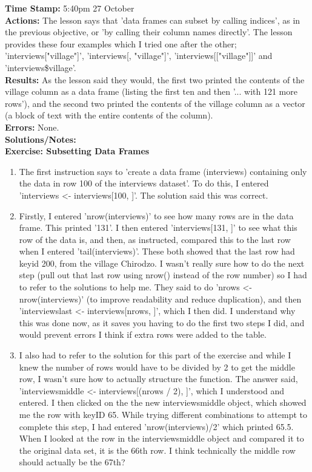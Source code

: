 \documentclass{article}
\begin{document}
\begin{FlushLeft}
\textbf{Time Stamp:} 5:40pm 27 October\\
\textbf{Actions:} The lesson says that 'data frames can subset by calling indices', as in the previous objective, or 'by calling their column names directly'. The lesson provides these four examples which I tried one after the other; 'interviews["village"]', 'interviews[, "village"]', 'interviews[["village"]]' and 'interviews\$village'.\\
\textbf{Results:} As the lesson said they would, the first two printed the contents of the village column as a data frame (listing the first ten and then '... with 121 more rows'), and the second two printed the contents of the village column as a vector (a block of text with the entire contents of the column).\\
\textbf{Errors:} None.\\
\textbf{Solutions/Notes:}\\
\vspace{5mm}
\textbf{Exercise: Subsetting Data Frames}\\ 
\begin{enumerate}
    \item The first instruction says to 'create a data frame (interviews) containing only the data in row 100 of the interviews dataset'. To do this, I entered 'interviews \textless - interviews[100, ]'. The solution said this was correct.
    \item Firstly, I entered 'nrow(interviews)' to see how many rows are in the data frame. This printed '131'. I then entered 'interviews[131, ]' to see what this row of the data is, and then, as instructed, compared this to the last row when I entered 'tail(interviews)'. These both showed that the last row had key\textunderscore id 200, from the village Chirodzo. I wasn't really sure how to do the next step (pull out that last row using nrow() instead of the row number) so I had to refer to the solutions to help me. They said to do 'n\textunderscore rows \textless - nrow(interviews)' (to improve readability and reduce duplication), and then 'interviews\textunderscore last \textless - interviews[n\textunderscore rows, ]', which I then did. I understand why this was done now, as it saves you having to do the first two steps I did, and would prevent errors I think if extra rows were added to the table.
    \item I also had to refer to the solution for this part of the exercise and while I knew the number of rows would have to be divided by 2 to get the middle row, I wasn't sure how to actually structure the function. The answer said, 'interviews\textunderscore middle \textless - interviews[(n\textunderscore rows / 2), ]', which I understood and entered. I then clicked on the the new interviews\textunderscore middle object, which showed me the row with key\textunderscore ID 65. While trying different combinations to attempt to complete this step, I had entered 'nrow(interviews)/2' which printed 65.5. When I looked at the row in the interviews\textunderscore middle object and compared it to the original data set, it is the 66th row. I think technically the middle row should actually be the 67th?

\end{enumerate}
\end{FlushLeft}
\end{document}
